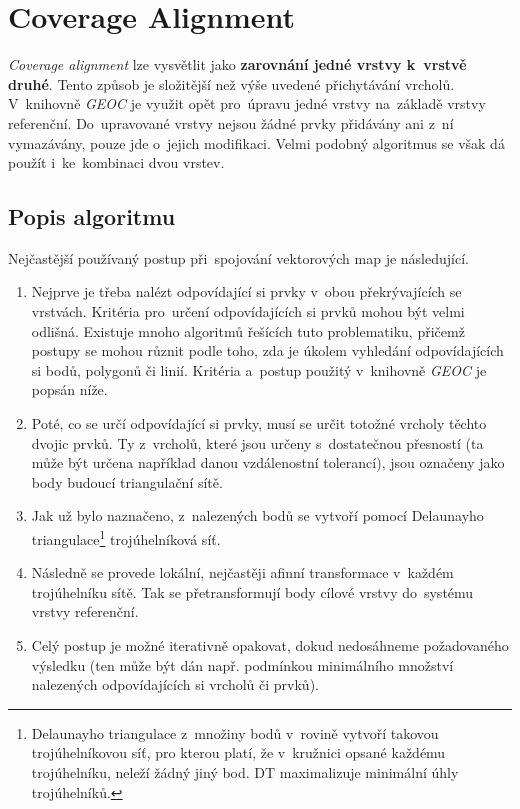 

\section{Coverage Alignment} 
\label{coverage alignment}

\textit{Coverage alignment} lze vysvětlit jako \textbf{zarovnání jedné vrstvy 
k~vrstvě druhé}. Tento způsob je složitější než výše uvedené přichytávání vrcholů.
V~knihovně \textit{GEOC} je využit opět pro~úpravu jedné vrstvy na~základě vrstvy 
referenční. Do~upravované vrstvy nejsou žádné prvky přidávány ani z~ní vymazávány,
pouze jde o~jejich modifikaci. Velmi podobný algoritmus se však dá použít 
i~ke~kombinaci dvou vrstev. 

\subsection{Popis algoritmu}
\label{ca-algoritmus}

Nejčastější používaný postup při~spojování vektorových map je následující.

\begin{enumerate}
 \item Nejprve je třeba nalézt odpovídající si prvky v~obou překrývajících se 
    vrstvách. Kritéria pro~určení odpovídajících si prvků mohou být velmi 
    odlišná. Existuje mnoho algoritmů řešících tuto problematiku, přičemž 
    postupy se mohou různit podle toho, zda je úkolem vyhledání 
    odpovídajících si bodů, polygonů či linií. Kritéria a~postup použitý 
    v~knihovně \textit{GEOC} je popsán níže.
 \item Poté, co se určí odpovídající si prvky, musí se určit totožné vrcholy 
    těchto dvojic prvků. Ty z~vrcholů, které jsou určeny s~dostatečnou 
    přesností (ta může být určena například danou vzdálenostní tolerancí), 
    jsou označeny jako body budoucí triangulační sítě.
 \item Jak už bylo naznačeno, z~nalezených bodů se vytvoří pomocí Delaunayho 
    triangulace\footnote{Delaunayho triangulace z~množiny bodů v~rovině vytvoří takovou 
    trojúhelníkovou síť, pro kterou platí, že v~kružnici opsané každému
    trojúhelníku, neleží žádný jiný bod. DT maximalizuje
    minimální úhly trojúhelníků.} trojúhelníková síť. 
 \item Následně se provede lokální, nejčastěji afinní transformace v~každém 
    trojúhelníku sítě. Tak se přetransformují body cílové vrstvy do~systému 
    vrstvy referenční.
 \item Celý postup je možné iterativně opakovat, dokud nedosáhneme 
    požadovaného výsledku (ten může být dán např. podmínkou minimálního 
    množství nalezených odpovídajících si vrcholů či prvků).
\end{enumerate}

